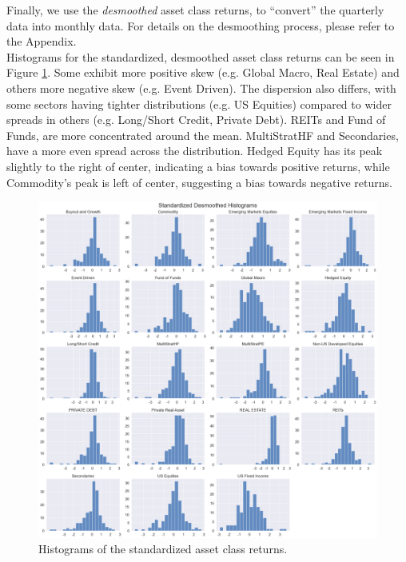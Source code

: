 \documentclass{ledger}
\begin{document}
Finally, we use the \textit{desmoothed} asset class returns, to ``convert'' the quarterly data into monthly data. For details on the desmoothing process, please refer to the Appendix. \\

Histograms for the standardized, desmoothed asset class returns can be seen in Figure \ref{fig:asset_class_histograms}. Some exhibit more positive skew (e.g. Global Macro, Real Estate) and others more negative skew (e.g. Event Driven). The dispersion also differs, with some sectors having tighter distributions (e.g. US Equities) compared to wider spreads in others (e.g. Long/Short Credit, Private Debt). REITs and Fund of Funds, are more concentrated around the mean. MultiStratHF and Secondaries, have a more even spread across the distribution. Hedged Equity has its peak slightly to the right of center, indicating a bias towards positive returns, while Commodity's peak is left of center, suggesting a bias towards negative returns.\\

\begin{figure}[!ht]
	\centering
	\includegraphics[width=430pt]{desmoothed_asset_class_histograms.pdf}
	\parbox{430pt}{\caption{Histograms of the standardized asset class returns. \label{fig:asset_class_histograms}}}
\end{figure}
\end{document}
